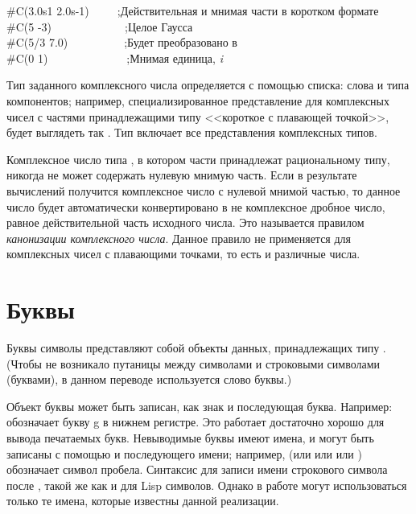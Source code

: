 \begin{lisp}
\#C(3.0s1 2.0s-1)~~~~~;\textrm{Действительная и мнимая части в коротком формате}\\
\#C(5 -3)~~~~~~~~~~~~~;\textrm{Целое Гаусса} \\
\#C(5/3 7.0)~~~~~~~~~~;\textrm{Будет преобразовано в } \\
\#C(0 1)~~~~~~~~~~~~~~;\textrm{Мнимая единица, \emph{i}}
\end{lisp}

Тип заданного комплексного числа определяется с помощью списка: слова
 и типа компонентов; например, специализированное представление для
комплексных чисел с частями принадлежащими типу <<короткое с плавающей точкой>>,
будет выглядеть так . Тип  включает все
представления комплексных типов.

Комплексное число типа , в котором части принадлежат
рациональному типу, никогда не может содержать нулевую мнимую часть. Если в
результате вычислений получится комплексное число с нулевой мнимой частью, то
данное число будет автоматически конвертировано в не комплексное дробное число,
равное действительной часть исходного числа. Это называется правилом
\emph{канонизации комплексного числа}. Данное правило не применяется для
комплексных чисел с плавающими точками, то есть  и  различные
числа.

\section{Буквы}

Буквы символы представляют собой объекты данных, принадлежащих типу
. (Чтобы не возникало путаницы между символами и
строковыми символами (буквами), в данном переводе используется слово
буквы.)

Объект буквы может быть записан, как знак \cd{\#{\Xbackslash}} и
последующая буква. Например:  
обозначает букву g в нижнем регистре. Это работает достаточно хорошо
для вывода печатаемых букв. Невыводимые буквы имеют имена, и могут быть
записаны с помощью \cd{\#{\Xbackslash}} и последующего имени; например,
 (или  или
 или ) обозначает символ пробела.
Синтаксис для записи имени строкового символа после \cd{\#{\Xbackslash}}, такой
же как и для Lisp символов. Однако в работе могут использоваться только те
имена, которые известны данной реализации.

